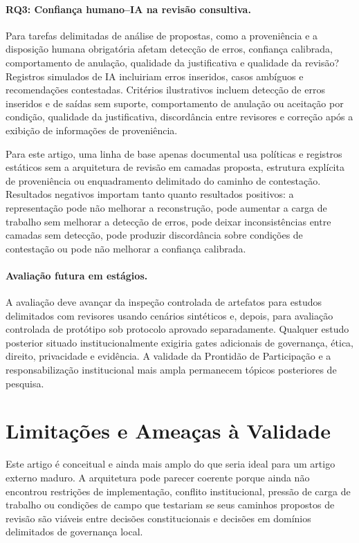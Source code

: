 \documentclass[11pt]{article}
\begin{document}
\paragraph{RQ3: Confiança humano--IA na revisão consultiva.} Para tarefas
delimitadas de análise de propostas, como a proveniência e a disposição humana
obrigatória afetam detecção de erros, confiança calibrada, comportamento de
anulação, qualidade da justificativa e qualidade da revisão? Registros
simulados de IA incluiriam erros inseridos, casos ambíguos e recomendações
contestadas. Critérios ilustrativos incluem detecção de erros inseridos e de
saídas sem suporte, comportamento de anulação ou aceitação por condição,
qualidade da justificativa, discordância entre revisores e correção após a
exibição de informações de proveniência.

Para este artigo, uma linha de base apenas documental usa políticas e registros
estáticos sem a arquitetura de revisão em camadas proposta, estrutura explícita
de proveniência ou enquadramento delimitado do caminho de contestação.
Resultados negativos importam tanto quanto resultados positivos: a
representação pode não melhorar a reconstrução, pode aumentar a carga de
trabalho sem melhorar a detecção de erros, pode deixar inconsistências entre
camadas sem detecção, pode produzir discordância sobre condições de
contestação ou pode não melhorar a confiança calibrada.

\paragraph{Avaliação futura em estágios.} A avaliação deve avançar da inspeção
controlada de artefatos para estudos delimitados com revisores usando cenários
sintéticos e, depois, para avaliação controlada de protótipo sob protocolo
aprovado separadamente. Qualquer estudo posterior situado institucionalmente
exigiria gates adicionais de governança, ética, direito, privacidade e
evidência. A validade da Prontidão de Participação e a responsabilização
institucional mais ampla permanecem tópicos posteriores de pesquisa.

\section{Limitações e Ameaças à Validade}

Este artigo é conceitual e ainda mais amplo do que seria ideal para um artigo
externo maduro. A arquitetura pode parecer coerente porque ainda não encontrou
restrições de implementação, conflito institucional, pressão de carga de
trabalho ou condições de campo que testariam se seus caminhos propostos de
revisão são viáveis entre decisões constitucionais e decisões em domínios
delimitados de governança local.
\end{document}

